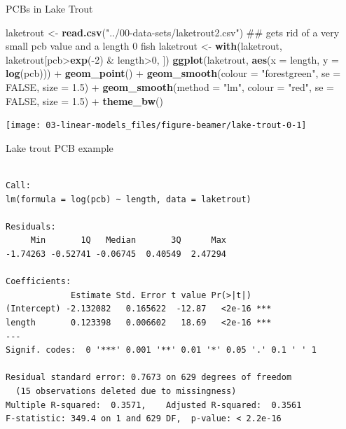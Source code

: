 \documentclass[10pt,ignorenonframetext,compress, aspectratio=169]{beamer}
\newenvironment{Shaded}{\begin{snugshade}}{\end{snugshade}}
\newcommand{\KeywordTok}[1]{\textcolor[rgb]{0.13,0.29,0.53}{\textbf{{#1}}}}
\newcommand{\DataTypeTok}[1]{\textcolor[rgb]{0.13,0.29,0.53}{{#1}}}
\newcommand{\DecValTok}[1]{\textcolor[rgb]{0.00,0.00,0.81}{{#1}}}
\newcommand{\FloatTok}[1]{\textcolor[rgb]{0.00,0.00,0.81}{{#1}}}
\newcommand{\StringTok}[1]{\textcolor[rgb]{0.31,0.60,0.02}{{#1}}}
\newcommand{\OtherTok}[1]{\textcolor[rgb]{0.56,0.35,0.01}{{#1}}}
\newcommand{\NormalTok}[1]{{#1}}
\begin{document}
\begin{frame}[fragile]{PCBs in Lake Trout}

\begin{Shaded}
\begin{Highlighting}[]
\NormalTok{laketrout <-}\StringTok{ }\KeywordTok{read.csv}\NormalTok{(}\StringTok{"../00-data-sets/laketrout2.csv"}\NormalTok{)}
\NormalTok{## gets rid of a very small pcb value and a length 0 fish}
\NormalTok{laketrout <-}\StringTok{ }\KeywordTok{with}\NormalTok{(laketrout, laketrout[pcb>}\KeywordTok{exp}\NormalTok{(-}\DecValTok{2}\NormalTok{) &}\StringTok{ }\NormalTok{length>}\DecValTok{0}\NormalTok{, ])}
\KeywordTok{ggplot}\NormalTok{(laketrout, }\KeywordTok{aes}\NormalTok{(}\DataTypeTok{x =} \NormalTok{length, }\DataTypeTok{y =} \KeywordTok{log}\NormalTok{(pcb))) +}
\StringTok{    }\KeywordTok{geom_point}\NormalTok{() +}
\StringTok{    }\KeywordTok{geom_smooth}\NormalTok{(}\DataTypeTok{colour =} \StringTok{"forestgreen"}\NormalTok{, }\DataTypeTok{se =} \OtherTok{FALSE}\NormalTok{, }\DataTypeTok{size =} \FloatTok{1.5}\NormalTok{) +}
\StringTok{    }\KeywordTok{geom_smooth}\NormalTok{(}\DataTypeTok{method =} \StringTok{"lm"}\NormalTok{, }\DataTypeTok{colour =} \StringTok{"red"}\NormalTok{, }\DataTypeTok{se =} \OtherTok{FALSE}\NormalTok{, }\DataTypeTok{size =} \FloatTok{1.5}\NormalTok{) +}
\StringTok{    }\KeywordTok{theme_bw}\NormalTok{()}
\end{Highlighting}
\end{Shaded}

\begin{center}\texttt{[image: 03-linear-models\_files/figure-beamer/lake-trout-0-1]} \end{center}

\end{frame}

\begin{frame}[fragile]{Lake trout PCB example}

\scriptsize

\begin{verbatim}

Call:
lm(formula = log(pcb) ~ length, data = laketrout)

Residuals:
     Min       1Q   Median       3Q      Max 
-1.74263 -0.52741 -0.06745  0.40549  2.47294 

Coefficients:
             Estimate Std. Error t value Pr(>|t|)    
(Intercept) -2.132082   0.165622  -12.87   <2e-16 ***
length       0.123398   0.006602   18.69   <2e-16 ***
---
Signif. codes:  0 '***' 0.001 '**' 0.01 '*' 0.05 '.' 0.1 ' ' 1

Residual standard error: 0.7673 on 629 degrees of freedom
  (15 observations deleted due to missingness)
Multiple R-squared:  0.3571,    Adjusted R-squared:  0.3561 
F-statistic: 349.4 on 1 and 629 DF,  p-value: < 2.2e-16
\end{verbatim}

\normalsize

\end{frame}
\end{document}
